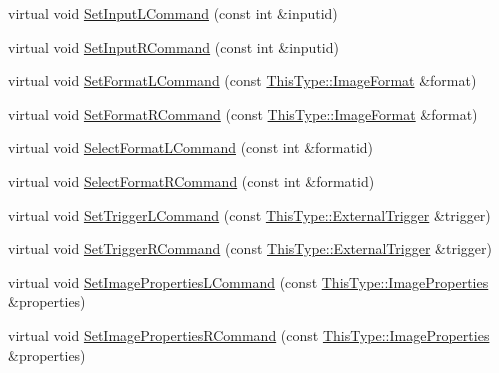 \begin{DoxyCompactItemize}
\item 
virtual void \hyperlink{classsvl_filter_source_video_capture_afbee99709cde9fc26d88815acfe24d57}{Set\+Input\+L\+Command} (const int \&inputid)
\item 
virtual void \hyperlink{classsvl_filter_source_video_capture_a37f49c97c934e171a3ddae4c06d0bc88}{Set\+Input\+R\+Command} (const int \&inputid)
\item 
virtual void \hyperlink{classsvl_filter_source_video_capture_a1d64fd9952f1eaf7b01b9b31273b8329}{Set\+Format\+L\+Command} (const \hyperlink{classsvl_filter_source_video_capture_a0944cc8abe4240701683128c28fa5349}{This\+Type\+::\+Image\+Format} \&format)
\item 
virtual void \hyperlink{classsvl_filter_source_video_capture_abf61696d18768de36cdfbc1ae47c65af}{Set\+Format\+R\+Command} (const \hyperlink{classsvl_filter_source_video_capture_a0944cc8abe4240701683128c28fa5349}{This\+Type\+::\+Image\+Format} \&format)
\item 
virtual void \hyperlink{classsvl_filter_source_video_capture_a0cdd80a307fa9216000ae363fe8664a8}{Select\+Format\+L\+Command} (const int \&formatid)
\item 
virtual void \hyperlink{classsvl_filter_source_video_capture_ad42cf6d7de3f1c517cf514a5878d5eb8}{Select\+Format\+R\+Command} (const int \&formatid)
\item 
virtual void \hyperlink{classsvl_filter_source_video_capture_ab81e6be420ad82b1c1414ebb1c7ca424}{Set\+Trigger\+L\+Command} (const \hyperlink{classsvl_filter_source_video_capture_a609a8eb75ea23b7b35068207cc3c3144}{This\+Type\+::\+External\+Trigger} \&trigger)
\item 
virtual void \hyperlink{classsvl_filter_source_video_capture_ab534dbc847bc8ee2099035c3e5833133}{Set\+Trigger\+R\+Command} (const \hyperlink{classsvl_filter_source_video_capture_a609a8eb75ea23b7b35068207cc3c3144}{This\+Type\+::\+External\+Trigger} \&trigger)
\item 
virtual void \hyperlink{classsvl_filter_source_video_capture_a24fe5d58190fbc762bcae850dff16645}{Set\+Image\+Properties\+L\+Command} (const \hyperlink{classsvl_filter_source_video_capture_ad5d8ccc6a284be386d49b60574937f4d}{This\+Type\+::\+Image\+Properties} \&properties)
\item 
virtual void \hyperlink{classsvl_filter_source_video_capture_abf3a679658d86ab8d23e27e2fde85e2a}{Set\+Image\+Properties\+R\+Command} (const \hyperlink{classsvl_filter_source_video_capture_ad5d8ccc6a284be386d49b60574937f4d}{This\+Type\+::\+Image\+Properties} \&properties)

\end{DoxyCompactItemize}

